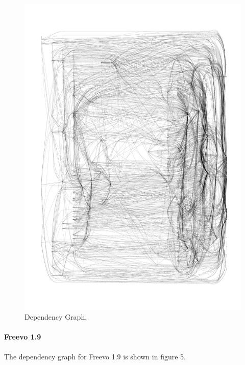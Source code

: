 \documentclass[10.5pt,journal, a4paper]{IEEEtran}
\begin{document}
\begin{figure}[H]
 \centering 
 \includegraphics[width=\columnwidth]{18full}
 \centering 
  \caption {Dependency Graph. }
 \end{figure}



\paragraph{Freevo 1.9}
\noindent
The dependency graph for Freevo 1.9 is shown in figure 5.
\end{document}
